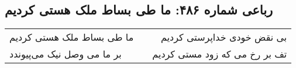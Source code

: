\begin{center}
\section*{رباعی شماره ۴۸۶: ما طی بساط ملک هستی کردیم}
\label{sec:sh486}
\begin{longtable}{l p{0.5cm} r}
ما طی بساط ملک هستی کردیم
&&
بی نقض خودی خداپرستی کردیم
\\
بر ما می وصل نیک می‌پیوندد
&&
تف بر رخ می که زود مستی کردیم
\\
\end{longtable}
\end{center}
